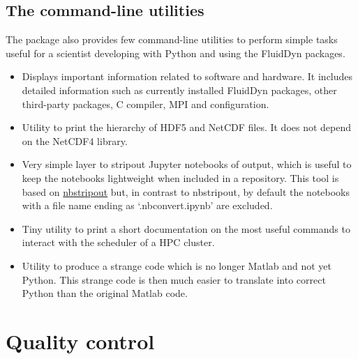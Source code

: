 \subsection*{The \fluiddyn command-line utilities}

The package \fluiddyn also provides few command-line utilities to perform
simple tasks useful for a scientist developing with Python and using the
FluidDyn packages.
\begin{itemize}

\item {}

Displays important information related to software and hardware. It
includes detailed information such as currently installed FluidDyn packages,
other third-party packages, C compiler, MPI and \Numpy configuration.

\item {}

Utility to print the hierarchy of HDF5 and NetCDF files. It does not depend on
the NetCDF4 library.

\item {}

Very simple layer to stripout Jupyter notebooks of output, which is useful to
keep the notebooks lightweight when included in a repository.
%
This tool is based on \href{https://github.com/kynan/nbstripout}{nbstripout}
but, in contrast to nbstripout,
%
by default the notebooks with a file name ending as `.nbconvert.ipynb' are
excluded.

\item {}

Tiny utility to print a short documentation on the most useful commands to
interact with the scheduler of a HPC cluster.

\item {}

Utility to produce a strange code which is no longer Matlab and not yet Python.
%
This strange code is then much easier to translate into correct Python than the
original Matlab code.

\end{itemize}


\section*{Quality control}


